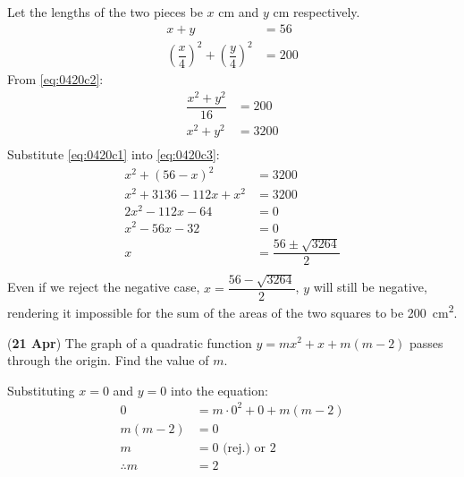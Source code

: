 \documentclass[12pt, answers]{exam} %
\renewcommand{\frac}[2]{\dfrac{#1}{#2}}
\begin{document}
\begin{questions}
\begin{parts}
\begin{solution}
			Let the lengths of the two pieces be \(x\) \si{\centi\metre} and \(y\) \si{\centi\metre} respectively.
			\begin{align}
				x + y                                                          & = 56 \label{eq:0420c1} \tag{1}  \\
				{\left(\frac{x}{4}\right)}^{2}+ {\left(\frac{y}{4}\right)}^{2} & = 200 \label{eq:0420c2} \tag{2}
			\end{align}
			From \eqref{eq:0420c2}:
			\begin{align*}
				\frac{x^{2} + y^{2}}{16} & = 200                            \\
				x^{2} + y^{2}            & = 3200 \label{eq:0420c3} \tag{3} \\
			\end{align*}
			Substitute \eqref{eq:0420c1} into \eqref{eq:0420c3}:
			\begin{align*}
				x^{2} + (56 - x)^{2}        & = 3200                         \\
				x^{2} + 3136 - 112x + x^{2} & = 3200                         \\
				2x^{2}  - 112x - 64         & = 0                            \\
				x^{2}  - 56x -32            & = 0                            \\
				x                           & = \frac{56 \pm \sqrt{3264}}{2} \\
			\end{align*}
			Even if we reject the negative case, \(x = \frac{56 - \sqrt{3264}}2\),
			\(y\) will still be negative,
			rendering it impossible for the sum of the areas of the two squares to be \qty{200}{\square\centi\metre}.
		\end{solution}
	\end{parts}

	\question (\textbf{21 Apr}) The graph of a quadratic function
	\(y = mx^2 + x + m(m - 2)\) passes through the origin. Find the value of \(m\).
	\begin{solution}
		Substituting \(x = 0\) and \(y = 0\) into the equation:
		\begin{align*}
			0            & = m \cdot 0^{2} + 0 + m(m - 2) \\
			m(m - 2)     & = 0                            \\
			m            & = 0 \text{ (rej.) or } 2       \\
			\therefore m & = 2
		\end{align*}
	\end{solution}


\end{questions}
\end{document}
